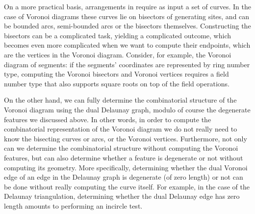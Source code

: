 On a more practical basis, arrangements in \cgal require as input a
set of curves. In the case of Voronoi diagrams these curves lie on
bisectors of generating sites, and can be bounded arcs, semi-bounded
arcs or the bisectors themselves. Constructing the bisectors can be
a complicated task, yielding a complicated outcome, which becomes even
more complicated when we want to compute their endpoints, which are
the vertices in the Voronoi diagram. Consider, for example, the
Voronoi diagram of segments: if the segments' coordinates are represented
by ring number type, computing the Voronoi bisectors and Voronoi
vertices requires a field number type that also supports square roots
on top of the field operations.

On the other hand, we can fully determine the combinatorial structure
of the Voronoi diagram using the dual Delaunay graph, modulo of course
the degenerate features we discussed above. In other words, in order
to compute the combinatorial representation of the Voronoi diagram we
do not really need to know the bisecting curves or arcs, or the
Voronoi vertices. Furthermore, not only can we determine the
combinatorial structure without computing the Voronoi features, but
can also determine whether a feature is degenerate or not without
computing its geometry. More specifically, determining whether the dual
Voronoi edge of an edge in the Delaunay graph is degenerate (of zero
length) or not can be done without really computing the curve itself.
For example, in the case of the Delaunay triangulation, determining
whether the dual Delaunay edge has zero length amounts to performing
an incircle test.

